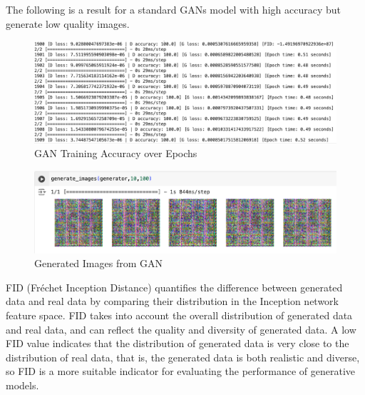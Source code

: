 The following is a result for a standard GANs model with high accuracy but generate low quality images.


\begin{figure}[H]
    \centering
    \includegraphics[width=1.2\linewidth]{./Images/model_accuracy.jpg}
    \caption{GAN Training Accuracy over Epochs}
    \label{fig:my_picture}
\end{figure}

\begin{figure}[H]
    \centering
    \includegraphics[width=1.2\linewidth]{./Images/generate_images.jpg}
    \caption{Generated Images from GAN}
    \label{fig:my_picture}
\end{figure}


FID (Fréchet Inception Distance) quantifies the difference between generated data and real 
data by comparing their distribution in the Inception network feature space. FID takes into 
account the overall distribution of generated data and real data, and can reflect the quality 
and diversity of generated data. A low FID value indicates that the distribution of generated 
data is very close to the distribution of real data, that is, the generated data is both realistic 
and diverse, so FID is a more suitable indicator for evaluating the performance of generative models.